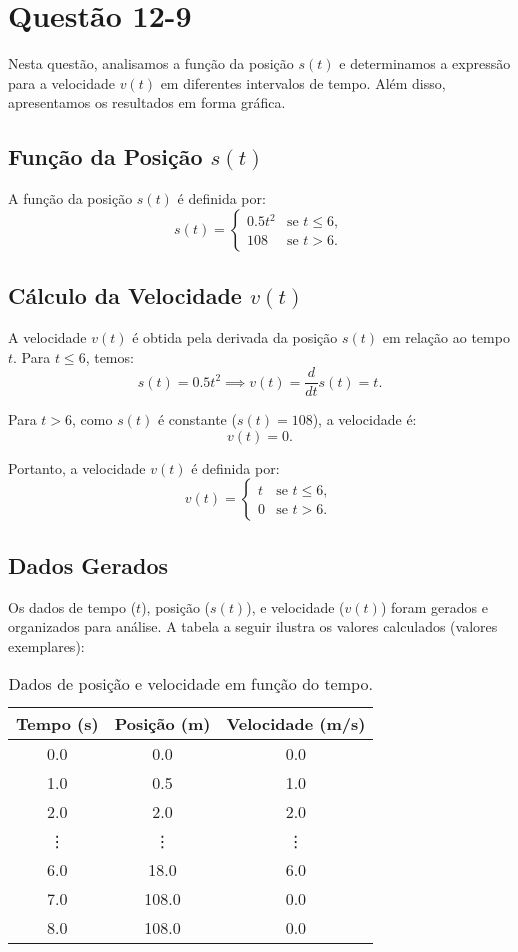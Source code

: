 \section{Questão 12-9}

Nesta questão, analisamos a função da posição \(s(t)\) e determinamos a expressão para a velocidade \(v(t)\) em diferentes intervalos de tempo. Além disso, apresentamos os resultados em forma gráfica.

\subsection*{Função da Posição \(s(t)\)}
A função da posição \(s(t)\) é definida por:
\[
s(t) = 
\begin{cases} 
0.5t^2 & \text{se } t \leq 6, \\
108 & \text{se } t > 6.
\end{cases}
\]

\subsection*{Cálculo da Velocidade \(v(t)\)}
A velocidade \(v(t)\) é obtida pela derivada da posição \(s(t)\) em relação ao tempo \(t\). Para \(t \leq 6\), temos:
\[
s(t) = 0.5t^2 \implies v(t) = \frac{d}{dt}s(t) = t.
\]

Para \(t > 6\), como \(s(t)\) é constante (\(s(t) = 108\)), a velocidade é:
\[
v(t) = 0.
\]

Portanto, a velocidade \(v(t)\) é definida por:
\[
v(t) = 
\begin{cases} 
t & \text{se } t \leq 6, \\
0 & \text{se } t > 6.
\end{cases}
\]

\subsection*{Dados Gerados}
Os dados de tempo (\(t\)), posição (\(s(t)\)), e velocidade (\(v(t)\)) foram gerados e organizados para análise. A tabela a seguir ilustra os valores calculados (valores exemplares):

\begin{table}[H]
    \centering
    \begin{tabular}{|c|c|c|}
        \hline
        \textbf{Tempo (s)} & \textbf{Posição (m)} & \textbf{Velocidade (m/s)} \\
        \hline
        0.0 & 0.0 & 0.0 \\
        1.0 & 0.5 & 1.0 \\
        2.0 & 2.0 & 2.0 \\
        \vdots & \vdots & \vdots \\
        6.0 & 18.0 & 6.0 \\
        7.0 & 108.0 & 0.0 \\
        8.0 & 108.0 & 0.0 \\
        \hline
    \end{tabular}
    \caption{Dados de posição e velocidade em função do tempo.}
\end{table}

